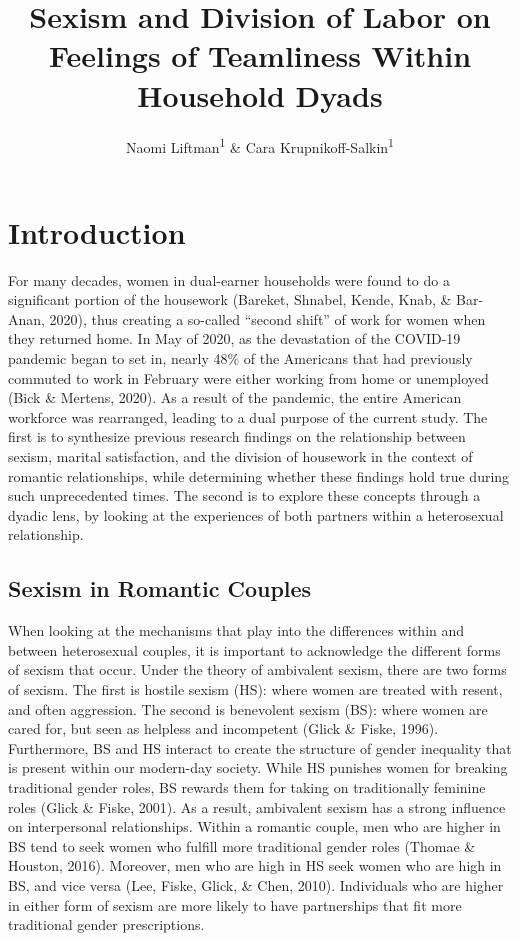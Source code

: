\documentclass[
  man]{apa6}
\title{Sexism and Division of Labor on Feelings of Teamliness Within Household Dyads}
\author{Naomi Liftman\textsuperscript{1} \& Cara Krupnikoff-Salkin\textsuperscript{1}}
\date{}
\affiliation{\vspace{0.5cm}\textsuperscript{1} Smith College}
\begin{document}
\maketitle

\hypertarget{introduction}{%
\section{Introduction}\label{introduction}}

For many decades, women in dual-earner households were found to do a significant portion of the housework (Bareket, Shnabel, Kende, Knab, \& Bar-Anan, 2020), thus creating a so-called ``second shift'' of work for women when they returned home. In May of 2020, as the devastation of the COVID-19 pandemic began to set in, nearly 48\% of the Americans that had previously commuted to work in February were either working from home or unemployed (Bick \& Mertens, 2020). As a result of the pandemic, the entire American workforce was rearranged, leading to a dual purpose of the current study. The first is to synthesize previous research findings on the relationship between sexism, marital satisfaction, and the division of housework in the context of romantic relationships, while determining whether these findings hold true during such unprecedented times. The second is to explore these concepts through a dyadic lens, by looking at the experiences of both partners within a heterosexual relationship.

\hypertarget{sexism-in-romantic-couples}{%
\subsection{Sexism in Romantic Couples}\label{sexism-in-romantic-couples}}

When looking at the mechanisms that play into the differences within and between heterosexual couples, it is important to acknowledge the different forms of sexism that occur. Under the theory of ambivalent sexism, there are two forms of sexism. The first is hostile sexism (HS): where women are treated with resent, and often aggression. The second is benevolent sexism (BS): where women are cared for, but seen as helpless and incompetent (Glick \& Fiske, 1996). Furthermore, BS and HS interact to create the structure of gender inequality that is present within our modern-day society. While HS punishes women for breaking traditional gender roles, BS rewards them for taking on traditionally feminine roles (Glick \& Fiske, 2001). As a result, ambivalent sexism has a strong influence on interpersonal relationships. Within a romantic couple, men who are higher in BS tend to seek women who fulfill more traditional gender roles (Thomae \& Houston, 2016). Moreover, men who are high in HS seek women who are high in BS, and vice versa (Lee, Fiske, Glick, \& Chen, 2010). Individuals who are higher in either form of sexism are more likely to have partnerships that fit more traditional gender prescriptions.
\end{document}
